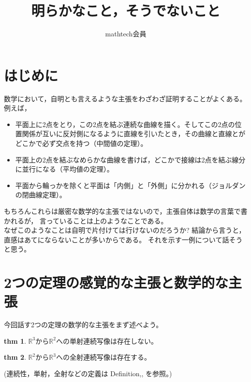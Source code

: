\documentclass[uplatex]{jsarticle}
\begin{document}
\title{明らかなこと，そうでないこと}
\author{mathtech会員}
\date{}
\maketitle
\newcommand{\R}{\mathbb{R}}
\newcommand{\N}{\mathbb{N}}
\newcommand{\Q}{\mathbb{Q}}
\newcommand{\Z}{\mathbb{Z}}
\newcommand{\C}{\mathbb{C}}
\newcommand{\st}{\sin \theta}
\newcommand{\ct}{\cos \theta}
\newtheorem{命題}{命題}
\newtheorem{thm}{thm}
\theoremstyle{definition}
\newtheorem{dfn}{Definition}
\newtheorem{definition}{Definition}
\newtheorem{fact}{Fact}




\section{はじめに}

数学において，自明とも言えるような主張をわざわざ証明することがよくある。
例えば，\\
\begin{itemize}
    \item 平面上に2点をとり，この2点を結ぶ連続な曲線を描く。そしてこの2点の位置関係が互いに反対側になるように直線を引いたとき，その曲線と直線とがどこかで必ず交点を持つ（中間値の定理）。
    \item 平面上の2点を結ぶなめらかな曲線を書けば，どこかで接線は2点を結ぶ線分に並行になる（平均値の定理）。
    \item 平面から輪っかを除くと平面は「内側」と「外側」に分かれる（ジョルダンの閉曲線定理）。
\end{itemize}

もちろんこれらは厳密な数学的な主張ではないので，主張自体は数学の言葉で書かれるが，
言っていることは上のようなことである。
\\
なぜこのようなことは自明で片付けては行けないのだろうか?
結論から言うと，直感はあてにならないことが多いからである。
それを示す一例について話そうと思う。

\section{2つの定理の感覚的な主張と数学的な主張}
今回話す2つの定理の数学的な主張をまず述べよう。

\begin{thm}\label{thm:injection}
    $
        \mathbb{R}^3から\mathbb{R}^2への単射連続写像は存在しない。
    $
\end{thm}

\begin{thm}\label{thm:surjection}
    $
        \mathbb{R}^2から\mathbb{R}^3への全射連続写像は存在する。
    $
\end{thm}
(連続性，単射，全射などの定義は
Definition,,
を参照。)
\end{document}
